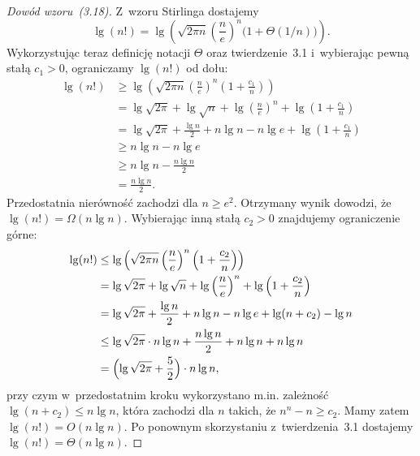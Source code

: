 \exercise %
\begin{proof}[Dowód wzoru~(3.18)]
	Z~wzoru Stirlinga dostajemy
	\[
		\lg(n!) = \lg\left(\sqrt{2\pi n}\left(\frac{n}{e}\right)^n\bigl(1+\Theta(1/n)\bigr)\right).
	\]
	Wykorzystując teraz definicję notacji $\Theta$ oraz twierdzenie~3.1 i~wybierając pewną stałą $c_1>0$, ograniczamy $\lg(n!)$ od dołu:
	\begin{align*}
		\lg(n!) &\ge \lg\left(\sqrt{2\pi n}\left(\frac{n}{e}\right)^n\left(1+\frac{c_1}{n}\right)\right) \\
		&= \lg\sqrt{2\pi}+\lg\sqrt{n}+\lg\left(\frac{n}{e}\right)^n+\lg\left(1+\frac{c_1}{n}\right) \\
		&= \lg\sqrt{2\pi}+\frac{\lg n}{2}+n\lg n-n\lg e+\lg\left(1+\frac{c_1}{n}\right) \\
		&\ge n\lg n-n\lg e\\
		&\ge n\lg n-\frac{n\lg n}{2} \\
		&= \frac{n\lg n}{2}.
	\end{align*}
	Przedostatnia nierówność zachodzi dla $n\ge e^2$. Otrzymany wynik dowodzi, że $\lg(n!)=\Omega(n\lg n)$. Wybierając inną stałą $c_2>0$ znajdujemy ograniczenie górne:
	\begin{align*}
		\lg(n!) &\le \lg\left(\sqrt{2\pi n}\left(\frac{n}{e}\right)^n\left(1+\frac{c_2}{n}\right)\right) \\
		&= \lg\sqrt{2\pi}+\lg\sqrt{n}+\lg\left(\frac{n}{e}\right)^n+\lg\left(1+\frac{c_2}{n}\right) \\
		&= \lg\sqrt{2\pi}+\frac{\lg n}{2}+n\lg n-n\lg e+\lg(n+c_2)-\lg n\\
		&\le \lg\sqrt{2\pi}\cdot n\lg n+\frac{n\lg n}{2}+n\lg n+n\lg n\\
		&= \Bigl(\lg\sqrt{2\pi}+\frac{5}{2}\Bigr)\cdot n\lg n,
	\end{align*}
	przy czym w~przedostatnim kroku wykorzystano \hbox{m.in.} zależność $\lg(n+c_2)\le n\lg n$, która zachodzi dla $n$ takich, że $n^n-n\ge c_2$. Mamy zatem $\lg(n!)=O(n\lg n)$. Po ponownym skorzystaniu z~twierdzenia~3.1 dostajemy $\lg(n!)=\Theta(n\lg n)$.
\end{proof}

